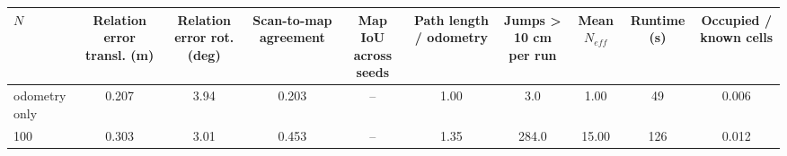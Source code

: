 \begin{tabular}{lccccccccc}
\toprule
$N$ & Relation error transl. (m) & Relation error rot. (deg) & Scan-to-map agreement & Map IoU across seeds & Path length / odometry & Jumps > 10 cm per run & Mean $N_{eff}$ & Runtime (s) & Occupied / known cells \\
\midrule
odometry only & 0.207 & 3.94 & 0.203 & -- & 1.00 & 3.0 & 1.00 & 49 & 0.006 \\
100 & 0.303 & 3.01 & 0.453 & -- & 1.35 & 284.0 & 15.00 & 126 & 0.012 \\
\bottomrule
\end{tabular}
